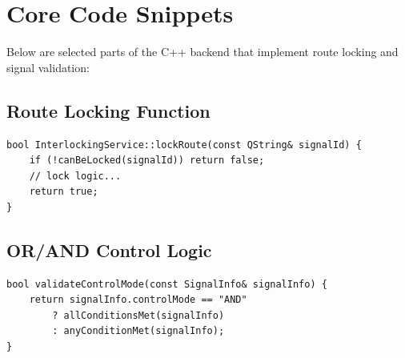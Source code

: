 \section*{Core Code Snippets}

Below are selected parts of the C++ backend that implement route locking and signal validation:

\subsection*{Route Locking Function}
\begin{verbatim}
bool InterlockingService::lockRoute(const QString& signalId) {
    if (!canBeLocked(signalId)) return false;
    // lock logic...
    return true;
}
\end{verbatim}

\subsection*{OR/AND Control Logic}
\begin{verbatim}
bool validateControlMode(const SignalInfo& signalInfo) {
    return signalInfo.controlMode == "AND"
        ? allConditionsMet(signalInfo)
        : anyConditionMet(signalInfo);
}
\end{verbatim}
